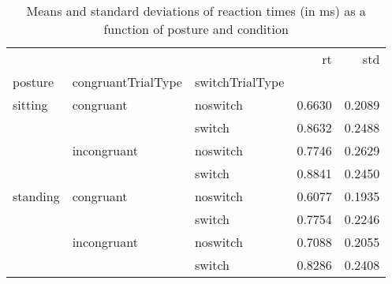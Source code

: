 \begin{table}
\centering
\caption{Means and standard deviations of reaction times (in ms) as a function of posture and condition}
\label{table-task-switching-replication-reaction-time}
\begin{tabular}{lllrr}
\toprule
         &             &        &     rt &    std \\
posture & congruantTrialType & switchTrialType &        &        \\
\midrule
sitting & congruant & noswitch & 0.6630 & 0.2089 \\
         &             & switch & 0.8632 & 0.2488 \\
         & incongruant & noswitch & 0.7746 & 0.2629 \\
         &             & switch & 0.8841 & 0.2450 \\
standing & congruant & noswitch & 0.6077 & 0.1935 \\
         &             & switch & 0.7754 & 0.2246 \\
         & incongruant & noswitch & 0.7088 & 0.2055 \\
         &             & switch & 0.8286 & 0.2408 \\
\bottomrule
\end{tabular}
\end{table}
